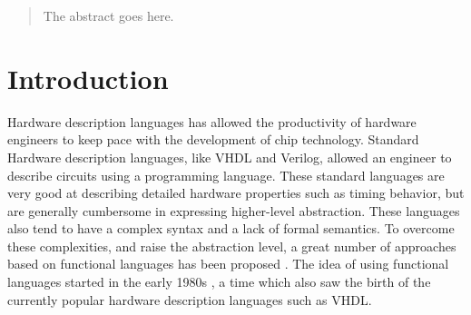 \documentclass[conference]{IEEEtran}
\begin{document}




\maketitle


\begin{abstract}
The abstract goes here.
\end{abstract}





%
\IEEEpeerreviewmaketitle


\section{Introduction}
Hardware description languages has allowed the productivity of hardware engineers to keep pace with the development of chip technology. Standard Hardware description languages, like VHDL and Verilog, allowed an engineer to describe circuits using a programming language. These standard languages are very good at describing detailed hardware properties such as timing behavior, but are generally cumbersome in expressing higher-level abstraction. These languages also tend to have a complex syntax and a lack of formal semantics. To overcome these complexities, and raise the abstraction level, a great number of approaches based on functional languages has been proposed \cite{T-Ruby,Hydra,HML2,Hawk1,Lava,ForSyDe1,Wired,reFLect}. The idea of using functional languages started in the early 1980s \cite{Cardelli1981,muFP,DAISY,FHDL}, a time which also saw the birth of the currently popular hardware description languages such as VHDL.
\end{document}
